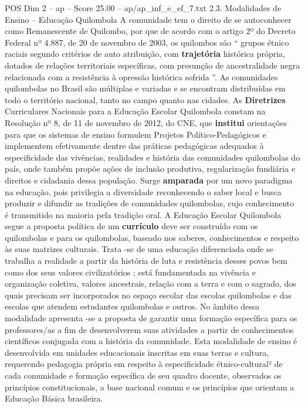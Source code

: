 \begin{textsample}{POS Dim 2 – ap – Score 25.00 – ap/ap\_inf\_e\_ef\_7.txt}  \label{ex:f2_pos_144}
2.3.
Modalidades de Ensino – Educação Quilombola A comunidade tem o direito de se autoconhecer como Remanescente de Quilombo, por que de acordo com o artigo 2º do Decreto Federal nº 4.887, de 20 de novembro de 2003, os quilombos são “ grupos étnico raciais segundo critérios de auto atribuição, com \textbf{trajetória} histórica própria, dotados de relações territoriais específicas, com presunção de ancestralidade negra relacionada com a resistência à opressão histórica sofrida ”.
As comunidades quilombolas no Brasil são múltiplas e variadas e se encontram distribuídas em todo o território nacional, tanto no campo quanto nas cidades.
As \textbf{Diretrizes} Curriculares Nacionais para a Educação Escolar Quilombola constam na Resolução nº 8, de 11 de novembro de 2012, do CNE, que \textbf{institui} orientações para que os sistemas de ensino formulem Projetos Político-Pedagógicos e implementem efetivamente dentre das práticas pedagógicas adequados à especificidade das vivências, realidades e história das comunidades quilombolas do país, onde também propõe ações de inclusão produtiva, regularização fundiária e direitos e cidadania dessa população.
Surge \textbf{amparada} por um novo paradigma na educação, pois privilegia a diversidade reconhecendo o saber local e busca produzir e difundir as tradições de comunidades quilombolas, cujo conhecimento é transmitido na maioria pela tradição oral.
A Educação Escolar Quilombola segue a proposta política de um \textbf{currículo} deve ser construído com os quilombolas e para os quilombolas, baseado nos saberes, conhecimentos e respeito às suas matrizes culturais.
Trata -se de uma educação diferenciada onde se trabalha a realidade a partir da história de luta e resistência desses povos bem como dos seus valores civilizatórios ; está fundamentada na vivência e organização coletiva, valores ancestrais, relação com a terra e com o sagrado, dos quais precisam ser incorporados no espaço escolar das escolas quilombolas e das escolas que atendem estudantes quilombolas e outros.
No âmbito dessa modalidade apresenta -se a proposta de garantir uma formação específica para os professores/as a fim de desenvolverem suas atividades a partir de conhecimentos científicos conjugada com a história da comunidade.
Esta modalidade de ensino é desenvolvida em unidades educacionais inscritas em suas terras e cultura, requerendo pedagogia própria em respeito à especificidade étnico-cultural² de cada comunidade e formação específica de seu quadro docente, observados os princípios constitucionais, a base nacional comum e os princípios que orientam a Educação Básica brasileira.

\end{textsample}
